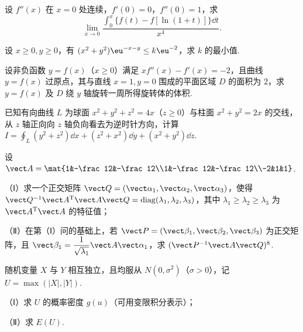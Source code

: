 \begin{question}[index=17,points=10]
设 $f''(x)$ 在 $x=0$ 处连续，$f'(0)=0$，$f''(0)=1$，求
\[\lim_{x\to0}\frac{\int_0^x\{f(t)-f[\ln(1+t)]\}\dd t}{x^4}.\]
\end{question}
\QuestionBreak\WorkSpace

\begin{question}[index=18,points=12]
设 $x\ge0,y\ge0$，有 $(x^2+y^2)\eu^{-x-y}\le k\eu^{-2}$，求 $k$ 的最小值.
\end{question}
\QuestionBreak\WorkSpace\WorkPageBreak

\begin{question}[index=19,points=12]
设非负函数 $y=f(x)$（$x\ge0$）满足 $xf''(x)-f'(x)=-2$，且曲线 $y=f(x)$ 过原点，其与直线 $x=1,y=0$ 围成的平面区域 $D$ 的面积为 $2$，求 $y=f(x)$ 及 $D$ 绕 $y$ 轴旋转一周所得旋转体的体积.
\end{question}
\QuestionBreak\WorkSpace

\begin{question}[index=20,points=12]
已知有向曲线 $L$ 为球面 $x^2+y^2+z^2=4x$（$z\ge0$）与柱面 $x^2+y^2=2x$ 的交线，从 $z$ 轴正向向 $z$ 轴负向看去为逆时针方向，计算 $\displaystyle I=\oint_L(y^2+z^2)\dd x+(z^2+x^2)\dd y+(x^2+y^2)\dd z$.
\end{question}
\QuestionBreak\WorkSpace\WorkPageBreak

\begin{question}[index=21,points=12]
设 $\vect A=\mat{1&-\frac12&-\frac12\\1&-\frac12&-\frac12\\-2&1&1}$.
\par（Ⅰ）求一个正交矩阵 $\vect Q=(\vect\alpha_1,\vect\alpha_2,\vect\alpha_3)$，使得 $\vect Q^{-1}\vect A^{\mathrm T}\vect A\vect Q=\operatorname{diag}(\lambda_1,\lambda_2,\lambda_3)$，其中 $\lambda_1\ge\lambda_2\ge\lambda_3$ 为 $\vect A^{\mathrm T}\vect A$ 的特征值；
\par（Ⅱ）在第（Ⅰ）问的基础上，若 $\vect P=(\vect\beta_1,\vect\beta_2,\vect\beta_3)$ 为正交矩阵，且 $\vect\beta_1=\dfrac1{\sqrt{\lambda_1}}\vect A\vect\alpha_1$，求 $(\vect P^{-1}\vect A\vect Q)^8$.
\end{question}
\QuestionBreak\WorkSpace

\begin{question}[index=22,points=12]
随机变量 $X$ 与 $Y$ 相互独立，且均服从 $N(0,\sigma^2)$（$\sigma>0$），记 $U=\max(|X|,|Y|)$.
\par（Ⅰ）求 $U$ 的概率密度 $g(u)$（可用变限积分表示）；
\par（Ⅱ）求 $E(U)$.
\end{question}
\WorkSpace
